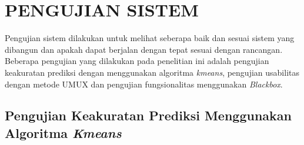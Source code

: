 \section{PENGUJIAN SISTEM}
\par Pengujian sistem dilakukan untuk melihat seberapa baik dan sesuai sistem yang dibangun dan apakah dapat berjalan dengan tepat sesuai dengan rancangan. Beberapa pengujian yang dilakukan pada penelitian ini adalah pengujian keakuratan prediksi dengan menggunakan algoritma \textit{kmeans}, pengujian usabilitas dengan metode UMUX dan pengujian fungsionalitas menggunakan \textit{Blackbox}.

\subsection{Pengujian Keakuratan Prediksi Menggunakan Algoritma \textit{Kmeans}}
